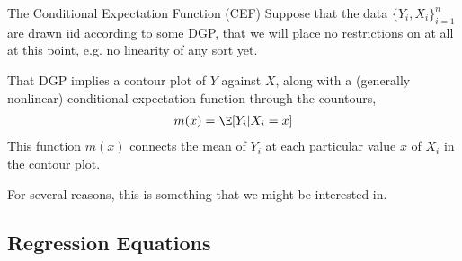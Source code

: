 \documentclass[aspectratio=169, handout]{beamer}
\begin{document}
{\footnotesize
\begin{frame}{The Conditional Expectation Function (CEF)}
Suppose that the data $\{Y_i,X_i\}_{i=1}^n$ are drawn iid according to
\alert{some DGP}, that we will place \alert{no restrictions} on at all
at this point, e.g. no linearity of any sort yet.

That DGP implies a contour plot of $Y$ against $X$, along with a
(generally nonlinear) conditional expectation function
through the countours,
\begin{align*}
  m(x) = \E[Y_i|X_i=x]
\end{align*}
This function $m(x)$ connects the mean of $Y_i$ at each particular value
$x$ of $X_i$ in the contour plot.

For several reasons, this is something that we might be interested in.
\end{frame}
}



\subsection{Regression Equations}
\end{document}
